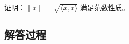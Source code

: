\begin{example}[范数性质证明]
    证明：\(\|x\| = \sqrt{\langle x, x \rangle}\) 满足范数性质。
    \end{example}
    
    \subsection*{解答过程}
    